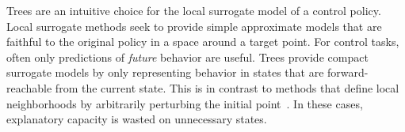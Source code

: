 \documentclass[letterpaper]{article} %
\begin{document}
Trees are an intuitive choice for the local surrogate model of a control policy.
Local surrogate methods seek to provide simple approximate models that are faithful to the original policy in a space around a target point.
For control tasks, often only predictions of \emph{future} behavior are useful.
Trees provide compact surrogate models by only representing behavior in states that are forward-reachable from the current state.
This is in contrast to methods that define local neighborhoods by arbitrarily perturbing the initial point~\cite{ribeiro2016}.
In these cases, explanatory capacity is wasted on unnecessary states.
\end{document}
